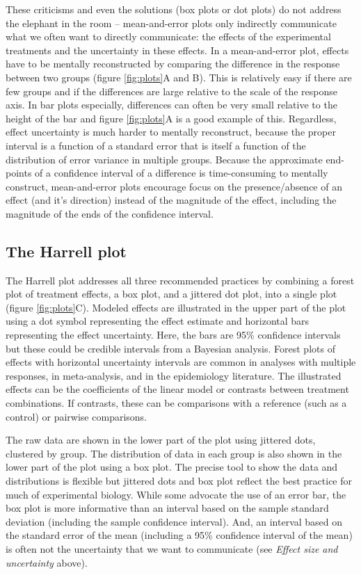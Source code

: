 \documentclass[fleqn,10pt,lineno]{wlpeerj} %
\theoremstyle{definition}
\theoremstyle{definition}
\theoremstyle{definition}
\theoremstyle{remark}
\begin{document}
These criticisms and even the solutions (box plots or dot plots) do not
address the elephant in the room -- mean-and-error plots only indirectly
communicate what we often want to directly communicate: the effects of
the experimental treatments and the uncertainty in these effects. In a
mean-and-error plot, effects have to be mentally reconstructed by
comparing the difference in the response between two groups (figure
\ref{fig:plots}A and B). This is relatively easy if there are few groups
and if the differences are large relative to the scale of the response
axis. In bar plots especially, differences can often be very small
relative to the height of the bar and figure \ref{fig:plots}A is a good
example of this. Regardless, effect uncertainty is much harder to
mentally reconstruct, because the proper interval is a function of a
standard error that is itself a function of the distribution of error
variance in multiple groups. Because the approximate end-points of a
confidence interval of a difference is time-consuming to mentally
construct, mean-and-error plots encourage focus on the presence/absence
of an effect (and it's direction) instead of the magnitude of the
effect, including the magnitude of the ends of the confidence interval.

\subsection*{The Harrell plot}\label{the-harrell-plot}

The Harrell plot addresses all three recommended practices by combining
a forest plot of treatment effects, a box plot, and a jittered dot plot,
into a single plot (figure \ref{fig:plots}C). Modeled effects are
illustrated in the upper part of the plot using a dot symbol
representing the effect estimate and horizontal bars representing the
effect uncertainty. Here, the bars are 95\% confidence intervals but
these could be credible intervals from a Bayesian analysis. Forest plots
of effects with horizontal uncertainty intervals are common in analyses
with multiple responses, in meta-analysis, and in the epidemiology
literature. The illustrated effects can be the coefficients of the
linear model or contrasts between treatment combinations. If contrasts,
these can be comparisons with a reference (such as a control) or
pairwise comparisons.

The raw data are shown in the lower part of the plot using jittered
dots, clustered by group. The distribution of data in each group is also
shown in the lower part of the plot using a box plot. The precise tool
to show the data and distributions is flexible but jittered dots and box
plot reflect the best practice for much of experimental biology. While
some advocate the use of an error bar, the box plot is more informative
than an interval based on the sample standard deviation (including the
sample confidence interval). And, an interval based on the standard
error of the mean (including a 95\% confidence interval of the mean) is
often not the uncertainty that we want to communicate (see \emph{Effect
size and uncertainty} above).
\end{document}
